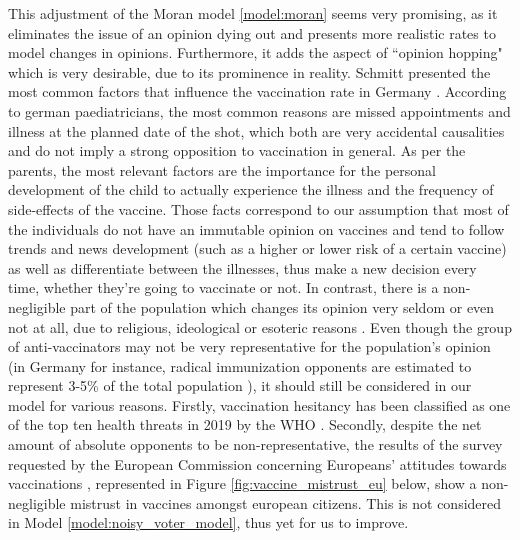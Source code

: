 \documentclass[12pt,a4paper,twoside]{article}
\begin{document}
This adjustment of the Moran model \eqref{model:moran} seems very promising, as it eliminates the issue of an opinion dying out and presents more realistic rates to model changes in opinions. Furthermore, it adds the aspect of ``opinion hopping" which is very desirable, due to its prominence in reality. Schmitt presented the most common factors that influence the vaccination rate in Germany \cite{Schmitt2001}. According to german paediatricians, the most common reasons are missed appointments and illness at the planned date of  the shot, which both are very accidental causalities and do not imply a strong opposition to vaccination in general. As per the parents, the most relevant factors are the importance for the personal development of the child to actually experience the illness and the frequency of side-effects of the vaccine. Those facts correspond to our assumption that most of the individuals do not have an immutable opinion on vaccines and tend to follow trends and news development (such as a higher or lower risk of a certain vaccine) as well as differentiate between the illnesses, thus make a new decision every time, whether they're going to vaccinate or not. In contrast, there is a non-negligible part of the population which changes its opinion very seldom or even not at all, due to religious, ideological or esoteric reasons \cite{Novotny1988, Bednarz2020, Health2019}. Even though the group of anti-vaccinators may not be very representative for the population's opinion (in Germany for instance, radical immunization opponents are estimated to represent 3-5\% of the total population \cite{Meyer2004, HorstkotterNMullerUOmmenOPlatteAReckendreesBStanderVLangPThaissH2017, HorstkotterNMullerUOmmenOPlatteAReckendreesBStanderVLangPThaissH2018}), it should still be considered in our model for various reasons. Firstly, vaccination hesitancy has been classified as one of the top ten health threats in 2019 by the \ac{WHO} \cite{WHOAkbar2019}. Secondly, despite the net amount of absolute opponents to be non-representative, the results of the survey requested by the European Commission concerning Europeans' attitudes towards vaccinations \cite{KantarBelgium2019}, represented in Figure \ref{fig:vaccine_mistrust_eu} below, show a non-negligible mistrust in vaccines amongst european citizens. This is not considered in Model \ref{model:noisy_voter_model}, thus yet for us to improve.%
\end{document}
